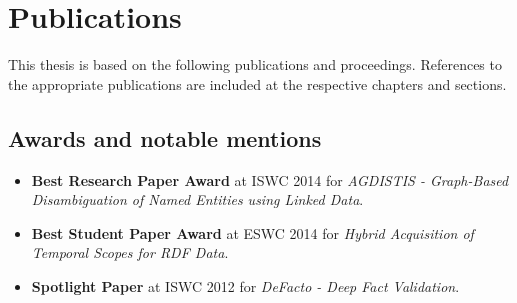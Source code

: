 \chapter*{Publications}

This thesis is based on the following publications and proceedings.
References to the appropriate publications are included at the respective chapters and sections.

\bigskip


\section*{Awards and notable mentions}
\begin{itemize}
    \item \textbf{Best Research Paper Award} at ISWC 2014 for \textit{AGDISTIS - Graph-Based Disambiguation of Named Entities using Linked Data}.
    \item \textbf{Best Student Paper Award} at ESWC 2014 for \textit{Hybrid Acquisition of Temporal Scopes for RDF Data}.
    \item \textbf{Spotlight Paper} at ISWC 2012 for \textit{DeFacto - Deep Fact Validation}.
\end{itemize}

